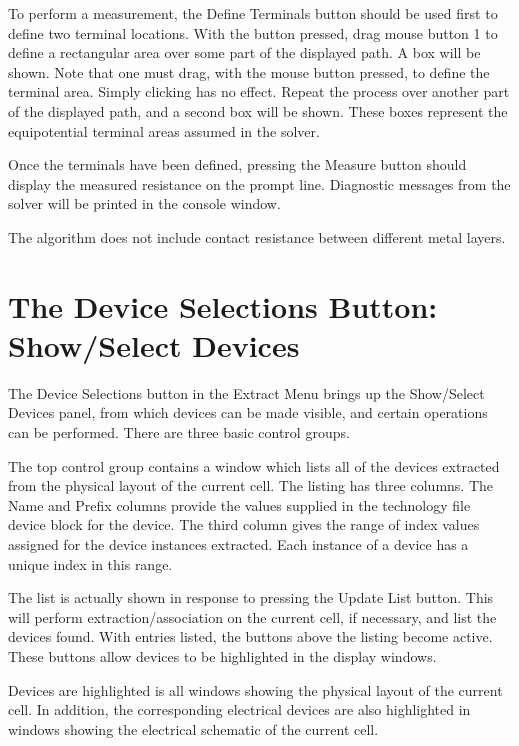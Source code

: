 To perform a measurement, the {\cb Define Terminals} button should be
used first to define two terminal locations.  With the button pressed,
drag mouse button 1 to define a rectangular area over some part of the
displayed path.  A box will be shown.  Note that one must drag, with
the mouse button pressed, to define the terminal area.  Simply
clicking has no effect.  Repeat the process over another part of the
displayed path, and a second box will be shown.  These boxes represent
the equipotential terminal areas assumed in the solver.

Once the terminals have been defined, pressing the {\cb Measure}
button should display the measured resistance on the prompt line. 
Diagnostic messages from the solver will be printed in the console
window. 

The algorithm does not include contact resistance between 
different metal layers.


\section{The {\cb Device Selections} Button: Show/Select Devices}
The {\cb Device Selections} button in the {\cb Extract Menu} brings up
the {\cb Show/Select Devices} panel, from which devices can be made
visible, and certain operations can be performed.  There are three
basic control groups.

The top control group contains a window which lists all of the devices
extracted from the physical layout of the current cell.  The listing
has three columns.  The {\cb Name} and {\cb Prefix} columns provide the
values supplied in the technology file device block for the device. 
The third column gives the range of index values assigned for the
device instances extracted.  Each instance of a device has a unique
index in this range.

The list is actually shown in response to pressing the {\cb Update
List} button.  This will perform extraction/association on the current
cell, if necessary, and list the devices found.  With entries listed,
the buttons above the listing become active.  These buttons allow
devices to be highlighted in the display windows.

Devices are highlighted is all windows showing the physical layout of
the current cell.  In addition, the corresponding electrical devices
are also highlighted in windows showing the electrical schematic of
the current cell.

